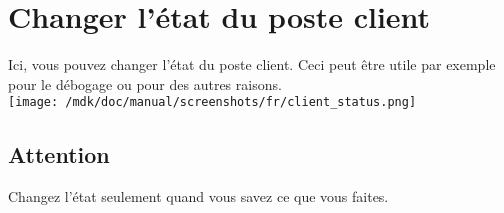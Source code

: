 \section{Changer l'\'etat du poste client}Ici, vous pouvez changer l'\'etat du poste client. Ceci peut \^etre utile par exemple pour le d\'ebogage ou pour des autres raisons.\\
\texttt{[image: /mdk/doc/manual/screenshots/fr/client\_status.png]} \\
\subsection{Attention}
Changez l'\'etat seulement quand vous savez ce que vous faites.\\
